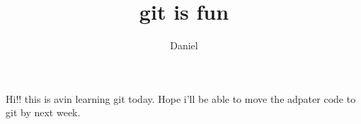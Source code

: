 \documentclass[10pt]{article}
\author{Daniel}
\title {git is fun}
\begin{document}
	\maketitle
	Hi!! this is avin learning git today. 
	Hope i'll be able to move the adpater code to git by next week.
\end{document}

